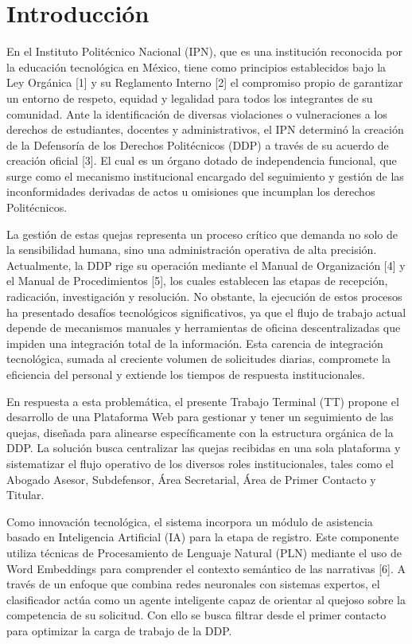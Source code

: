 \chapter{Introducción}
\label{ch:introduccion}

    En el Instituto Politécnico Nacional (IPN), que es una institución reconocida por la educación tecnológica en México, tiene como principios establecidos bajo la Ley Orgánica [1] y su Reglamento Interno [2] el compromiso propio de garantizar un entorno de respeto, equidad y legalidad para todos los integrantes de su comunidad. Ante la identificación de diversas violaciones o vulneraciones a los derechos de estudiantes, docentes y administrativos, el IPN determinó la creación de la Defensoría de los Derechos Politécnicos (DDP) a través de su acuerdo de creación oficial [3]. El cual es un órgano dotado de independencia funcional, que surge como el mecanismo institucional encargado del seguimiento y gestión de las inconformidades derivadas de actos u omisiones que incumplan los derechos Politécnicos.
    
    La gestión de estas quejas representa un proceso crítico que demanda no solo de la sensibilidad humana, sino una administración operativa de alta precisión. Actualmente, la DDP rige su operación mediante el Manual de Organización [4] y el Manual de Procedimientos [5], los cuales establecen las etapas de recepción, radicación, investigación y resolución. No obstante, la ejecución de estos procesos ha presentado desafíos tecnológicos significativos, ya que el flujo de trabajo actual depende de mecanismos manuales y herramientas de oficina descentralizadas que impiden una integración total de la información. Esta carencia de integración tecnológica, sumada al creciente volumen de solicitudes diarias, compromete la eficiencia del personal y extiende los tiempos de respuesta institucionales.
    
    En respuesta a esta problemática, el presente Trabajo Terminal (TT) propone el desarrollo de una Plataforma Web para gestionar y tener un seguimiento de las quejas, diseñada para alinearse específicamente con la estructura orgánica de la DDP. La solución busca centralizar las quejas recibidas en una sola plataforma y sistematizar el flujo operativo de los diversos roles institucionales, tales como el Abogado Asesor, Subdefensor, Área Secretarial, Área de Primer Contacto y Titular.
    
    Como innovación tecnológica, el sistema incorpora un módulo de asistencia basado en Inteligencia Artificial (IA) para la etapa de registro. Este componente utiliza técnicas de Procesamiento de Lenguaje Natural (PLN) mediante el uso de Word Embeddings para comprender el contexto semántico de las narrativas [6]. A través de un enfoque que combina redes neuronales con sistemas expertos, el clasificador actúa como un agente inteligente capaz de orientar al quejoso sobre la competencia de su solicitud. Con ello se busca filtrar desde el primer contacto para optimizar la carga de trabajo de la DDP.


